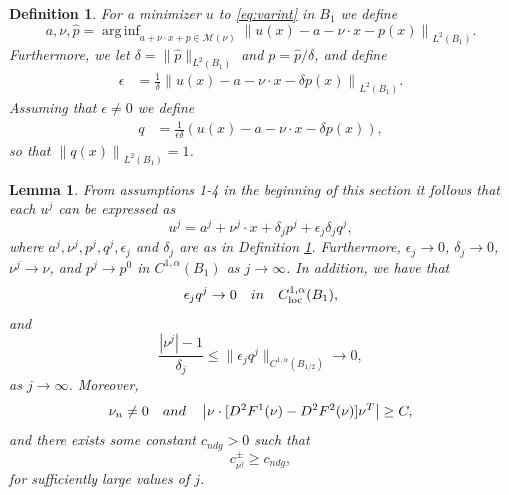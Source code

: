 \documentclass[10pt,a4paper]{amsart}
\newtheorem{lem}{Lemma}
\newtheorem{definition}{Definition}
\DeclareMathOperator*{\arginf}{arg\,inf}
\newcommand{\loc}{\mathrm{loc}}
\begin{document}
\begin{definition}
\label{def:pk}
{\sl For a minimizer $u$ to \eqref{eq:varint} in $B_1$ we define
\begin{equation*}
    a, \nu, \hat{p} = \arginf_{a + \nu \cdot x + p \in \mathcal{M}(\nu)} \left\|u(x)-a -\nu \cdot x - p(x) \right\|_{L^2(B_1)}.
\end{equation*}
 Furthermore, we let $\delta=  \|\hat{p} \|_{L^2(B_1)}$ and $p = \hat{p}/\delta$, and define
\begin{align*}
    \epsilon  &=  \frac{1}{\delta}  \left\|u(x) -a - \nu \cdot x - \delta p(x) \right\|_{L^2(B_1)}.
\end{align*}
Assuming that $\epsilon \neq 0$ we define
\begin{align*}
     q &= \frac{1}{\epsilon \delta} \left(u(x) -a - \nu \cdot x - \delta p(x) \right),
\end{align*}
so that $\left\|q(x) \right\|_{L^2(B_1)} = 1$.}
\end{definition}

\begin{lem}\label{lem:summaryuj}
   From assumptions 1-4 in the beginning of this section it follows that each $u^j$ can be expressed as
$$
    u^j=a^j+\nu^j\cdot x+\delta_jp^j+\epsilon_j\delta_j q^j,
$$
where $a^j,\nu^j,p^j,q^j,\epsilon_j$ and $\delta_j$ are as in Definition \ref{def:pk}. Furthermore, $\epsilon_j \to 0$, $\delta_j \to 0$, $\nu^j \to \nu$, and $p^j \to p^0$ in $C^{1, \alpha}(B_1)$ as $j \to \infty$. In addition, we have that
    \begin{equation}\label{eq:qjass1}
        \epsilon_j q^j \to 0 \quad \textup{in} \quad C^{1,\alpha}_{\loc}(B_1),
    \end{equation}
and
\begin{equation}\label{eq:qjass2}
  \frac{|\nu^j|-1}{\delta_j} \leq \|\epsilon_jq^j\|_{C^{1,\alpha}(B_{1/2})}\to 0,
 \end{equation}
as $j \to \infty$. Moreover,
    \begin{equation}\label{eq:qjass3}
 \nu_n \neq 0 \quad \textup{and} \quad \left|\nu \cdot [D^2 F^1(\nu)- D^2 F^2(\nu)]  \nu^T \right| \geq C,
\end{equation}
and there exists some constant $c_{ndg} >0$ such that 
 \begin{equation}\label{eq:qjass4}
     c_{\nu^j}^{\pm} \geq c_{ndg},
 \end{equation}
for sufficiently large values of $j$.

\end{lem}
\end{document}
